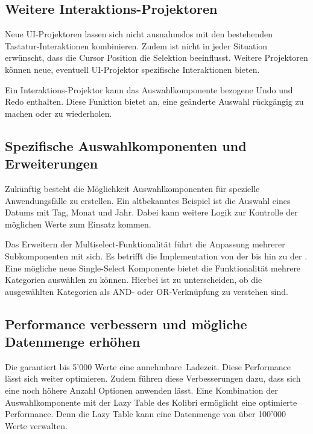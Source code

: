 \subsection{Weitere Interaktions-Projektoren}
\label{sec:moreInteraction}

Neue UI-Projektoren lassen sich nicht ausnahmslos mit den bestehenden Tastatur-Inter\-aktionen kombinieren. 
Zudem ist nicht in jeder Situation erwünscht, dass die Cursor Position die Selektion beeinflusst.
Weitere Projektoren können neue, eventuell UI-Projektor spezifische Interaktionen bieten.

Ein Interaktions-Projektor kann das Auswahlkomponente bezogene Undo und Redo enthalten.
Diese Funktion bietet an, eine geänderte Auswahl rückgängig zu machen oder zu wiederholen.


\subsection{Spezifische Auswahlkomponenten und Erweiterungen}
\label{sec:specificComponents}

Zukünftig besteht die Möglichkeit Auswahlkomponenten für spezielle Anwendungsfälle zu erstellen.
Ein altbekanntes Beispiel ist die Auswahl eines Datums mit Tag, Monat und Jahr.
Dabei kann weitere Logik zur Kontrolle der möglichen Werte zum Einsatz kommen.

Das Erweitern der Multiselect-Funktionalität führt die Anpassung mehrerer Subkomponenten mit sich.
Es betrifft die Implementation von der  bis hin zu der .
Eine mögliche neue Single-Select Komponente bietet die Funktionalität mehrere Kategorien auswählen zu können.
Hierbei ist zu unterscheiden, ob die ausgewählten Kategorien als AND- oder OR-Verknüpfung zu verstehen sind.


\subsection{Performance verbessern und mögliche Datenmenge erhöhen}
\label{sec:betterPerformance}

Die  garantiert bis 5'000 Werte eine annehmbare\footnotemark \ Ladezeit.
Diese Performance lässt sich weiter optimieren.
Zudem führen diese Verbesserungen dazu, dass sich eine noch höhere Anzahl Optionen anwenden lässt.
Eine Kombination der Auswahlkomponente mit der Lazy Table des Kolibri ermöglicht eine optimierte Performance.
Denn die Lazy Table kann eine Datenmenge von über 100'000 Werte verwalten.


